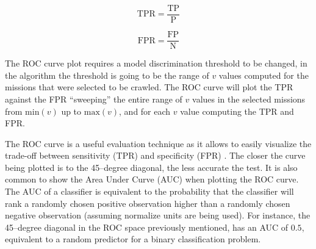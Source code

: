 \begin{equation} \label{eq:tpr}
    \text{TPR} = \dfrac{\text{TP}}{\text{P}}
\end{equation}

\begin{equation} \label{eq:fpr}
    \text{FPR} = \dfrac{\text{FP}}{\text{N}}
\end{equation}

The ROC curve plot requires a model discrimination threshold to be changed, in the \mlblink algorithm the threshold is going to be the range of $v$ values computed for the missions that were selected to be crawled. The ROC curve will plot the TPR against the FPR ``sweeping'' the entire range of $v$ values in the selected missions from $\text{min}(v)$ up to $\text{max}(v)$, and for each $v$ value computing the TPR and FPR. \newline

The ROC curve is a useful evaluation technique as it allows to easily visualize the trade-off between sensitivity (TPR) and specificity (FPR) \cite{book:esl}. The closer the curve being plotted is to the 45--degree diagonal, the less accurate the test. It is also common to show the Area Under Curve (AUC) when plotting the ROC curve. The AUC of a classifier is equivalent to the probability that the classifier will rank a randomly chosen positive observation higher than a randomly chosen negative observation \cite{article:roc-analysis} (assuming normalize units are being used). For instance, the 45--degree diagonal in the ROC space previously mentioned, has an AUC of $0.5$, equivalent to a random predictor for a binary classification problem.